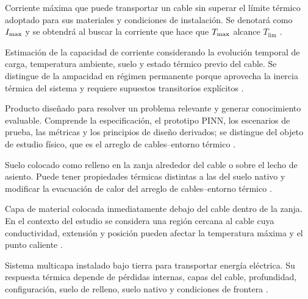 \begin{description}[style=nextline,itemsep=0.5\baselineskip,parsep=0pt,topsep=0.25\baselineskip]
  \item[Ampacidad.] Corriente máxima que puede transportar un cable sin superar el límite térmico adoptado para sus materiales y condiciones de instalación. Se denotará como $I_{\max}$ y se obtendrá al buscar la corriente que hace que $T_{\max}$ alcance $T_{\mathrm{lim}}$ \parencites[752--760]{neher1957}{anders2005}[cláusulas 4--5]{iec60287}[3--6]{enescu2021}.

  \item[Ampacidad dinámica o DTR.] Estimación de la capacidad de corriente considerando la evolución temporal de carga, temperatura ambiente, suelo y estado térmico previo del cable. Se distingue de la ampacidad en régimen permanente porque aprovecha la inercia térmica del sistema y requiere supuestos transitorios explícitos \parencites[cláusulas 2--4]{iec60853}[3--6]{enescu2021}[14843--14845]{fariz2026}.

  \item[Artefacto.] Producto diseñado para resolver un problema relevante y generar conocimiento evaluable. Comprende la especificación, el prototipo PINN, los escenarios de prueba, las métricas y los principios de diseño derivados; se distingue del objeto de estudio físico, que es el arreglo de cables--entorno térmico \parencites[55--56]{peffers2007}[342--350]{gregor2013}.

  \item[Suelo de relleno.] Suelo colocado como relleno en la zanja alrededor del cable o sobre el lecho de asiento. Puede tener propiedades térmicas distintas a las del suelo nativo y modificar la evacuación de calor del arreglo de cables--entorno térmico \parencites{anders2005}[1--3]{atoccsa2024}[1,10,16]{kim2025}[secciones 4--6]{ieee442}.

  \item[Lecho de asiento.] Capa de material colocada inmediatamente debajo del cable dentro de la zanja. En el contexto del estudio se considera una región cercana al cable cuya conductividad, extensión y posición pueden afectar la temperatura máxima y el punto caliente \parencites[1--4]{oclon2015}[1,10,16]{kim2025}[secciones 4--6]{ieee442}.

  \item[Cable eléctrico enterrado.] Sistema multicapa instalado bajo tierra para transportar energía eléctrica. Su respuesta térmica depende de pérdidas internas, capas del cable, profundidad, configuración, suelo de relleno, suelo nativo y condiciones de frontera \parencites[752--760]{neher1957}{anders2005}[3--5]{enescu2020}[fig.~2]{kim2025}.


\end{description}
